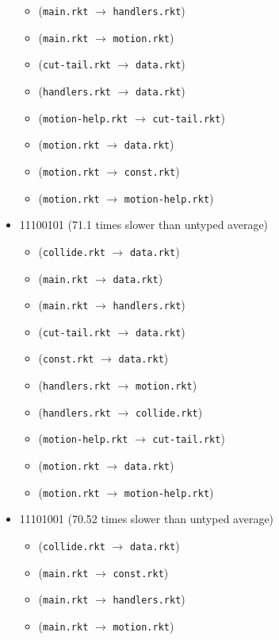 \documentclass{article}
\newcommand{\mono}[1]{\texttt{#1}}
\begin{document}
\begin{itemize}
\begin{itemize}
  \item (\mono{main.rkt} $\rightarrow$ \mono{handlers.rkt})
  \item (\mono{main.rkt} $\rightarrow$ \mono{motion.rkt})
  \item (\mono{cut-tail.rkt} $\rightarrow$ \mono{data.rkt})
  \item (\mono{handlers.rkt} $\rightarrow$ \mono{data.rkt})
  \item (\mono{motion-help.rkt} $\rightarrow$ \mono{cut-tail.rkt})
  \item (\mono{motion.rkt} $\rightarrow$ \mono{data.rkt})
  \item (\mono{motion.rkt} $\rightarrow$ \mono{const.rkt})
  \item (\mono{motion.rkt} $\rightarrow$ \mono{motion-help.rkt})
  \end{itemize}
\item 11100101 (71.1 times slower than untyped average)
  \begin{itemize}
  \item (\mono{collide.rkt} $\rightarrow$ \mono{data.rkt})
  \item (\mono{main.rkt} $\rightarrow$ \mono{data.rkt})
  \item (\mono{main.rkt} $\rightarrow$ \mono{handlers.rkt})
  \item (\mono{cut-tail.rkt} $\rightarrow$ \mono{data.rkt})
  \item (\mono{const.rkt} $\rightarrow$ \mono{data.rkt})
  \item (\mono{handlers.rkt} $\rightarrow$ \mono{motion.rkt})
  \item (\mono{handlers.rkt} $\rightarrow$ \mono{collide.rkt})
  \item (\mono{motion-help.rkt} $\rightarrow$ \mono{cut-tail.rkt})
  \item (\mono{motion.rkt} $\rightarrow$ \mono{data.rkt})
  \item (\mono{motion.rkt} $\rightarrow$ \mono{motion-help.rkt})
  \end{itemize}
\item 11101001 (70.52 times slower than untyped average)
  \begin{itemize}
  \item (\mono{collide.rkt} $\rightarrow$ \mono{data.rkt})
  \item (\mono{main.rkt} $\rightarrow$ \mono{const.rkt})
  \item (\mono{main.rkt} $\rightarrow$ \mono{handlers.rkt})
  \item (\mono{main.rkt} $\rightarrow$ \mono{motion.rkt})

\end{itemize}
\end{itemize}
\end{document}
